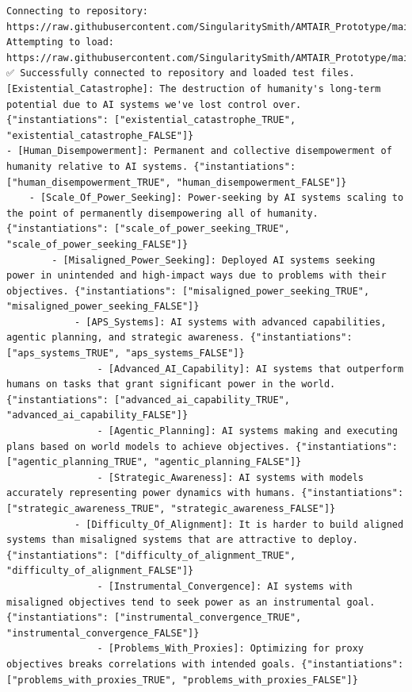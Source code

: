 \documentclass[
  11pt,
  letterpaper,
]{book}
\begin{document}
\begin{verbatim}
Connecting to repository: https://raw.githubusercontent.com/SingularitySmith/AMTAIR_Prototype/main/data/example_carlsmith/
Attempting to load: https://raw.githubusercontent.com/SingularitySmith/AMTAIR_Prototype/main/data/example_carlsmith/ArgDown.md
✅ Successfully connected to repository and loaded test files.
[Existential_Catastrophe]: The destruction of humanity's long-term potential due to AI systems we've lost control over. {"instantiations": ["existential_catastrophe_TRUE", "existential_catastrophe_FALSE"]}
- [Human_Disempowerment]: Permanent and collective disempowerment of humanity relative to AI systems. {"instantiations": ["human_disempowerment_TRUE", "human_disempowerment_FALSE"]}
    - [Scale_Of_Power_Seeking]: Power-seeking by AI systems scaling to the point of permanently disempowering all of humanity. {"instantiations": ["scale_of_power_seeking_TRUE", "scale_of_power_seeking_FALSE"]}
        - [Misaligned_Power_Seeking]: Deployed AI systems seeking power in unintended and high-impact ways due to problems with their objectives. {"instantiations": ["misaligned_power_seeking_TRUE", "misaligned_power_seeking_FALSE"]}
            - [APS_Systems]: AI systems with advanced capabilities, agentic planning, and strategic awareness. {"instantiations": ["aps_systems_TRUE", "aps_systems_FALSE"]}
                - [Advanced_AI_Capability]: AI systems that outperform humans on tasks that grant significant power in the world. {"instantiations": ["advanced_ai_capability_TRUE", "advanced_ai_capability_FALSE"]}
                - [Agentic_Planning]: AI systems making and executing plans based on world models to achieve objectives. {"instantiations": ["agentic_planning_TRUE", "agentic_planning_FALSE"]}
                - [Strategic_Awareness]: AI systems with models accurately representing power dynamics with humans. {"instantiations": ["strategic_awareness_TRUE", "strategic_awareness_FALSE"]}
            - [Difficulty_Of_Alignment]: It is harder to build aligned systems than misaligned systems that are attractive to deploy. {"instantiations": ["difficulty_of_alignment_TRUE", "difficulty_of_alignment_FALSE"]}
                - [Instrumental_Convergence]: AI systems with misaligned objectives tend to seek power as an instrumental goal. {"instantiations": ["instrumental_convergence_TRUE", "instrumental_convergence_FALSE"]}
                - [Problems_With_Proxies]: Optimizing for proxy objectives breaks correlations with intended goals. {"instantiations": ["problems_with_proxies_TRUE", "problems_with_proxies_FALSE"]}

\end{verbatim}
\end{document}

